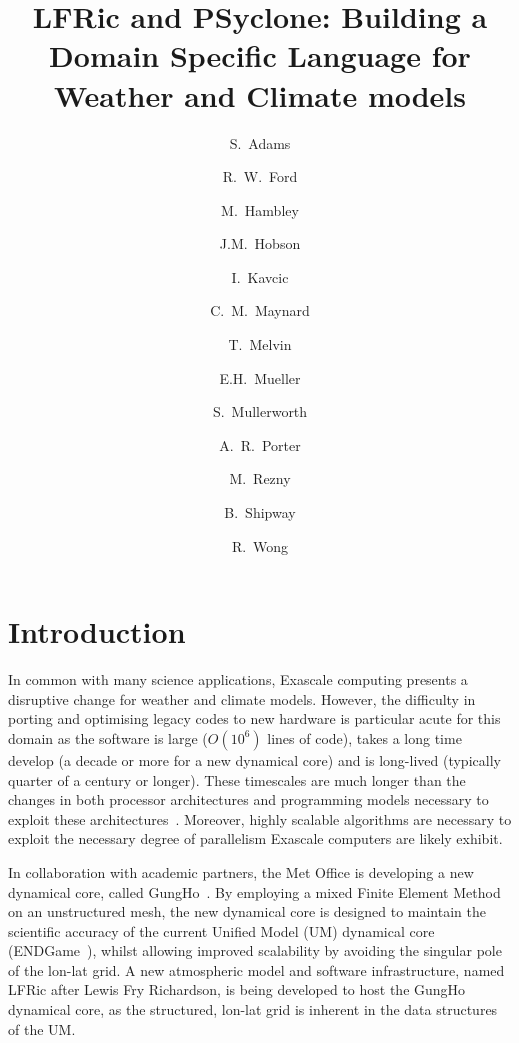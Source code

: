\documentclass[times]{elsarticle}
\begin{document}
\begin{frontmatter}

\title{LFRic and PSyclone: Building a Domain Specific Language for Weather and Climate models}

\author[met]{S.~Adams}
\author[hartree]{R.~W.~Ford}
\author[met]{M.~Hambley}
\author[met]{J.M.~Hobson}
\author[met]{I.~Kavcic}
\author[met,read]{C.~M.~Maynard}
\author[met]{T.~Melvin}
\author[bath]{E.H.~Mueller}
\author[met]{S.~Mullerworth}
\author[hartree]{A.~R.~Porter}
\author[downunder]{M.~Rezny}
\author[met]{B.~Shipway}
\author[met]{R.~Wong}




\address[met]{Met Office, FitzRoy Road, Exeter, EX1 3PB}
\address[hartree]{Hartree Centre, STFC Daresbury, Grim up North}
\address[read]{Department of Computer Science, Polly Vacher Building,
  University of Reading, Reading, UK, RG6 6AY}
\address[bath]{Department of Mathematics, University of Bath, Bath}
\address[downunder]{Monash University, Melbourne, Australia}

\begin{abstract}
\end{abstract}

\begin{keyword}

\end{keyword}

\end{frontmatter}

\section{Introduction}
In common with many science applications, Exascale computing presents
a disruptive change for weather and climate models. However, the
difficulty in porting and optimising legacy codes to new hardware is
particular acute for this domain as the software is large ($O(10^6)$
lines of code), takes a long time develop (a decade or more for a new
dynamical core) and is long-lived (typically quarter of a century or longer). These
timescales are much longer than the changes in both processor
architectures and programming models necessary to exploit these
architectures~\cite{gmd-2017-186}. Moreover, highly scalable
algorithms are necessary to exploit the necessary degree of
parallelism Exascale computers are likely exhibit.

In collaboration with academic partners, the Met Office is developing
a new dynamical core, called GungHo~\cite{melvin2018}. By
employing a mixed Finite Element Method on an unstructured mesh, the
new dynamical core is designed to maintain the scientific accuracy of
the current Unified Model (UM) dynamical core (ENDGame~\cite{QJ:QJ2235}),
whilst allowing improved scalability by avoiding the singular pole of
the lon-lat grid. A new atmospheric model and software infrastructure,
named LFRic after Lewis Fry Richardson, is being developed to host the
GungHo dynamical core, as the structured, lon-lat grid is inherent in the
data structures of the UM.
\end{document}
